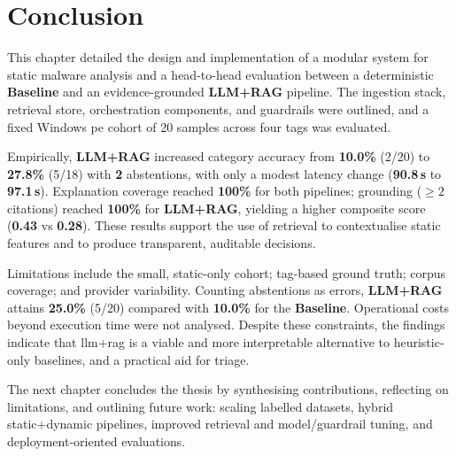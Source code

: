 \section{Conclusion}\label{sec:ChapterConclusion}
This chapter detailed the design and implementation of a modular system for static malware analysis
and a head-to-head evaluation between a deterministic \textbf{Baseline} and an evidence-grounded
\textbf{LLM+RAG} pipeline. The ingestion stack, retrieval store, orchestration components, and
guardrails were outlined, and a fixed Windows \gls{pe} cohort of 20 samples across four tags was
evaluated.

Empirically, \textbf{LLM+RAG} increased category accuracy from \textbf{10.0\%} (2/20) to
\textbf{27.8\%} (5/18) with \textbf{2} abstentions, with only a modest latency change
(\textbf{90.8\,s} to \textbf{97.1\,s}). Explanation coverage reached \textbf{100\%} for both
pipelines; grounding (\(\geq 2\) citations) reached \textbf{100\%} for \textbf{LLM+RAG}, yielding a
higher composite score (\textbf{0.43} vs \textbf{0.28}). These results support the use of retrieval
to contextualise static features and to produce transparent, auditable decisions.

Limitations include the small, static-only cohort; tag-based ground truth; corpus coverage; and
provider variability. Counting abstentions as errors, \textbf{LLM+RAG} attains \textbf{25.0\%}
(5/20) compared with \textbf{10.0\%} for the \textbf{Baseline}. Operational costs beyond execution
time were not analysed. Despite these constraints, the findings indicate that \gls{llm}+\gls{rag}
is a viable and more interpretable alternative to heuristic-only baselines, and a practical aid for
triage.

The next chapter concludes the thesis by synthesising contributions, reflecting on limitations, and
outlining future work: scaling labelled datasets, hybrid static+dynamic pipelines, improved
retrieval and model/guardrail tuning, and deployment-oriented evaluations.
